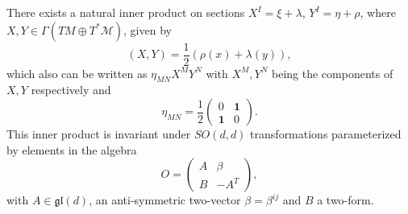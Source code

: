 There exists a natural inner product on sections $X^I=\xi+\lambda$, $Y^I=\eta+\rho$, where $X,Y\in\Gamma(TM\oplus T^*\mathcal{M})$, given by
\begin{equation}
    (X,Y) = \frac{1}{2}\left(\rho(x)+\lambda(y)\right),
\end{equation}
which also can be written as $\eta_{MN}X^MY^N$ with $X^M,Y^N$ being the components of $X,Y$ respectively and 
\begin{equation}
    \eta_{MN} = \frac{1}{2}\begin{pmatrix}0&\mathbf{1}\\\mathbf{1}&0\end{pmatrix}.
\end{equation}
This inner product is invariant under $SO(d,d)$ transformations parameterized by elements in the algebra 
\begin{equation}
    O = \begin{pmatrix}
            A & \beta \\
            B & -A^{T}
        \end{pmatrix},
\end{equation}
with $A\in \mathfrak{gl}(d)$, an anti-symmetric two-vector $\beta=\beta^{ij}$ and $B$ a two-form. 

